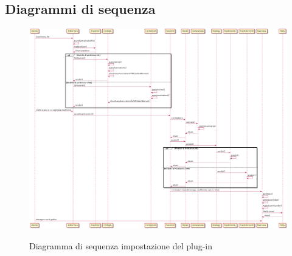 \documentclass[../specifica-tecnica.tex]{subfiles}
\begin{document}
\subsection{Diagrammi di sequenza}
\begin{figure}[H]
  \begin{center}
    \includegraphics[width=18cm]{../../diagrammi/diagrammi-grafana-plugin/out/sequenceDiagramPlug.png}\\
    \caption{Diagramma di sequenza impostazione del plug-in}%
  \end{center}
\end{figure}
\end{document}
